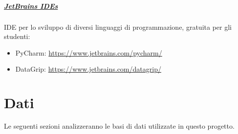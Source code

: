\documentclass[%
    corpo=12pt,
    twoside,
    oldstyle,
    autoretitolo,
    greek,
    evenboxes,
]{toptesi}
\begin{document}
\paragraph{\href{https://www.jetbrains.com/}{JetBrains IDEs}} IDE per lo sviluppo di diversi linguaggi di programmazione, gratuita per gli studenti:
\begin{itemize}
  \item PyCharm: \url{https://www.jetbrains.com/pycharm/}
  \item DataGrip: \url{https://www.jetbrains.com/datagrip/}
\end{itemize}



\chapter{Dati}
\label{chap:dataset}
Le seguenti sezioni analizzeranno le basi di dati utilizzate in questo progetto.
\end{document}
